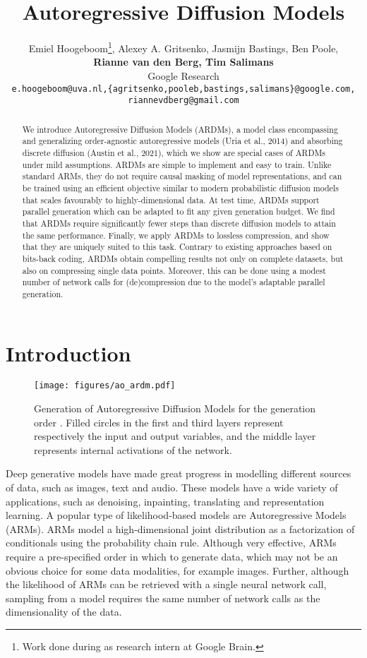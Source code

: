 \documentclass{article} \usepackage{iclr2022_conference,times}
\title{Autoregressive Diffusion Models}
\author{Emiel Hoogeboom\thanks{Work done during as research intern at Google Brain.}, Alexey A. Gritsenko, Jasmijn Bastings, Ben Poole, \\ \textbf{Rianne van den Berg, Tim Salimans} \\
Google Research \\
\texttt{e.hoogeboom@uva.nl,\{agritsenko,pooleb,bastings,salimans\}@google.com,} \\ \texttt{riannevdberg@gmail.com}
}
\begin{document}
\maketitle

\begin{abstract}
We introduce Autoregressive Diffusion Models (ARDMs), a model class encompassing and generalizing order-agnostic autoregressive models (Uria et al., 2014) and absorbing discrete diffusion (Austin et al., 2021), which we show are special cases of ARDMs under mild assumptions. ARDMs are simple to implement and easy to train. Unlike standard ARMs, they do not require causal masking of model representations, and can be trained using an efficient objective similar to modern probabilistic diffusion models that scales favourably to highly-dimensional data. At test time, ARDMs support parallel generation which can be adapted to fit any given generation budget. We find that ARDMs require significantly fewer steps than discrete diffusion models to attain the same performance. Finally, we apply ARDMs to lossless compression, and show that they are uniquely suited to this task. Contrary to existing approaches based on bits-back coding, ARDMs obtain compelling results not only on complete datasets, but also on compressing single data points. Moreover, this can be done using a modest number of network calls for (de)compression due to the model's adaptable parallel generation. \end{abstract}

\section{Introduction}

\begin{figure}[b]
    \centering
    \vspace{-.3cm}
    \texttt{[image: figures/ao\_ardm.pdf]}
    \vspace{-.25cm}
    \caption{Generation of Autoregressive Diffusion Models for the generation order . Filled circles in the first and third layers represent respectively the input and output variables, and the middle layer represents internal activations of the network.}
    \label{fig:overview}
\end{figure}
Deep generative models have made great progress in modelling different sources of data, such as images, text and audio. These models have a wide variety of applications, such as denoising, inpainting, translating and representation learning. A popular type of likelihood-based models are Autoregressive Models (ARMs). ARMs model a high-dimensional joint distribution as a factorization of conditionals using the probability chain rule. Although very effective, ARMs require a pre-specified order in which to generate data, which may not be an obvious choice for some data modalities, for example images. Further, although the likelihood of ARMs can be retrieved with a single neural network call, sampling from a model requires the same number of network calls as the dimensionality of the data.
\end{document}
